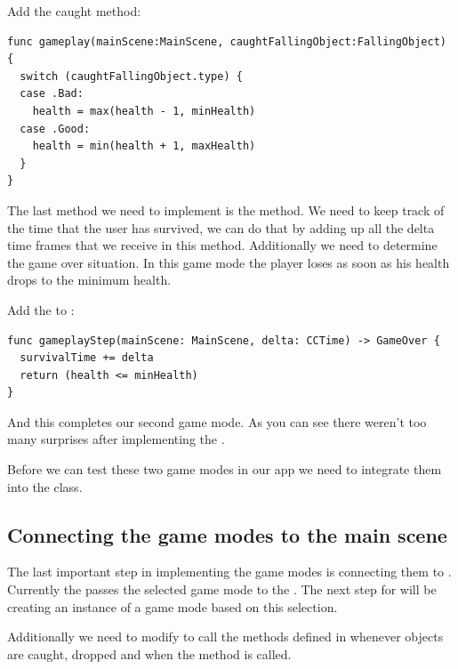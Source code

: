 \begin{leftbar}
Add the caught method:
\begin{lstlisting}
func gameplay(mainScene:MainScene, caughtFallingObject:FallingObject) {
  switch (caughtFallingObject.type) {
  case .Bad:
    health = max(health - 1, minHealth)
  case .Good:
    health = min(health + 1, maxHealth)
  }
}
\end{lstlisting}
\end{leftbar}


The last method we need to implement is the  method. We need to keep track of the time that the user has survived,
we can do that by adding up all the delta time frames that we receive in this
method. Additionally we need to determine the game over situation. In this game
mode the player loses as soon as his health drops to the minimum health.

\begin{leftbar}
Add the  to :
\begin{lstlisting}
func gameplayStep(mainScene: MainScene, delta: CCTime) -> GameOver {
  survivalTime += delta
  return (health <= minHealth)
}
\end{lstlisting}
\end{leftbar}
And this completes our second game mode. As you can see there weren't too many
surprises after implementing the .

Before we can test these two game modes in our app we need to integrate them
into the  class.

\subsection{Connecting the game modes to the main scene}
The last important step in implementing the game modes is connecting them to
. Currently the  passes the
selected game mode to the . The next step for 
 will be creating an instance of a game mode based on this
selection.

Additionally we need to modify  to call the methods
defined in  whenever objects are caught, dropped
and when the  method is called.

